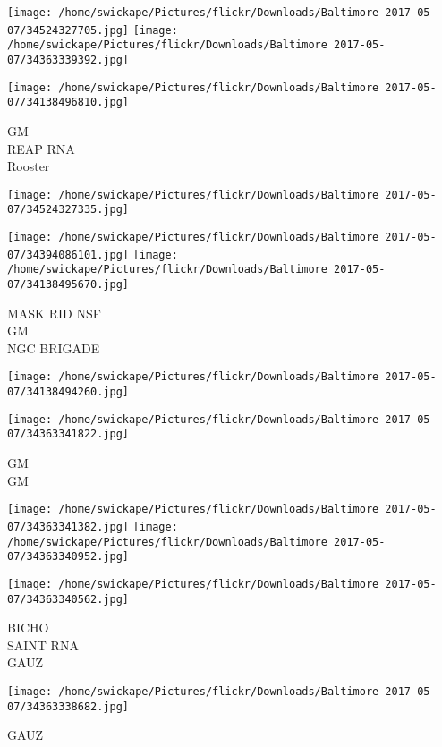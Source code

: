 \documentclass[10pt,letterpaper]{article}
\begin{document}
\texttt{[image: /home/swickape/Pictures/flickr/Downloads/Baltimore 2017-05-07/34524327705.jpg]}
\texttt{[image: /home/swickape/Pictures/flickr/Downloads/Baltimore 2017-05-07/34363339392.jpg]}

\texttt{[image: /home/swickape/Pictures/flickr/Downloads/Baltimore 2017-05-07/34138496810.jpg]}

GM\\
REAP RNA\\
Rooster
\pagebreak

\texttt{[image: /home/swickape/Pictures/flickr/Downloads/Baltimore 2017-05-07/34524327335.jpg]}

\vspace{0.25in}
\texttt{[image: /home/swickape/Pictures/flickr/Downloads/Baltimore 2017-05-07/34394086101.jpg]}
\texttt{[image: /home/swickape/Pictures/flickr/Downloads/Baltimore 2017-05-07/34138495670.jpg]}

MASK RID NSF\\
GM\\
NGC BRIGADE
\pagebreak

\texttt{[image: /home/swickape/Pictures/flickr/Downloads/Baltimore 2017-05-07/34138494260.jpg]}

\vspace{0.25in}
\texttt{[image: /home/swickape/Pictures/flickr/Downloads/Baltimore 2017-05-07/34363341822.jpg]}

GM\\
GM
\pagebreak

\texttt{[image: /home/swickape/Pictures/flickr/Downloads/Baltimore 2017-05-07/34363341382.jpg]}
\texttt{[image: /home/swickape/Pictures/flickr/Downloads/Baltimore 2017-05-07/34363340952.jpg]}

\vspace{0.25in}
\texttt{[image: /home/swickape/Pictures/flickr/Downloads/Baltimore 2017-05-07/34363340562.jpg]}

BICHO\\
SAINT RNA\\
GAUZ
\pagebreak

\texttt{[image: /home/swickape/Pictures/flickr/Downloads/Baltimore 2017-05-07/34363338682.jpg]}

GAUZ
\pagebreak
\end{document}
